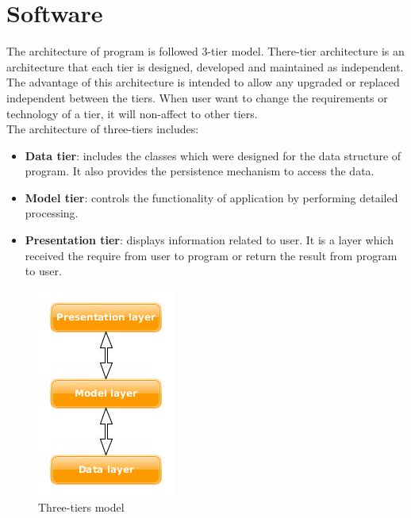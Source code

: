 \chapter{Software}

The architecture of program is followed 3-tier model. There-tier architecture is an architecture that each tier is designed, developed and maintained as independent. The advantage of this architecture is intended to allow any upgraded or replaced independent between the tiers. When user want to change the requirements or technology of a tier, it will non-affect to other tiers.\\[0.3cm]
The architecture of three-tiers includes:
\begin{itemize}
	\item \textbf{Data tier}: includes the classes which were designed for the data structure of program. It also provides the persistence mechanism to access the data.
	\item \textbf{Model tier}: controls the functionality of application by performing detailed processing.
	\item \textbf{Presentation tier}: displays information related to user. It is a layer which received the require from user to program or return the result from program to user. 
\end{itemize}
\begin{figure}[h]
	\centering
	\includegraphics[scale=0.7]{images/software_3tiers}
	\caption{Three-tiers model}
	\label{fign3iters}
\end{figure}
